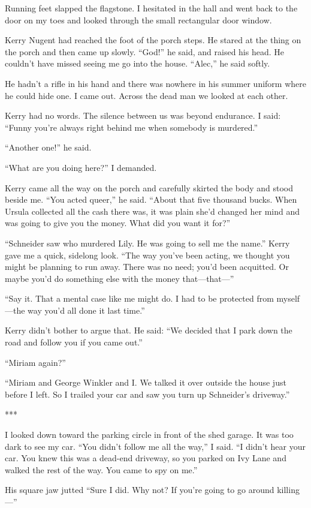 \documentclass{novel}
\begin{document}
Running feet slapped the flagstone. I hesitated in the hall and went back to the door on my toes and looked through the small rectangular door window.

Kerry Nugent had reached the foot of the porch steps. He stared at the thing on the porch and then came up slowly. “God!” he said, and raised his head. He couldn’t have missed seeing me go into the house. “Alec,” he said softly.

He hadn’t a rifle in his hand and there was nowhere in his summer uniform where he could hide one. I came out. Across the dead man we looked at each other.

Kerry had no words. The silence between us was beyond endurance. I said: “Funny you’re always right behind me when somebody is murdered.”

“Another one!” he said.

“What are you doing here?” I demanded.

Kerry came all the way on the porch and carefully skirted the body and stood beside me. “You acted queer,” he said. “About that five thousand bucks. When Ursula collected all the cash there was, it was plain she’d changed her mind and was going to give you the money. What did you want it for?”

“Schneider saw who murdered Lily. He was going to sell me the name.” Kerry gave me a quick, sidelong look. “The way you’ve been acting, we thought you might be planning to run away. There was no need; you’d been acquitted. Or maybe you’d do something else with the money that—that—”

“Say it. That a mental case like me might do. I had to be protected from myself—the way you’d all done it last time.”

Kerry didn’t bother to argue that. He said: “We decided that I park down the road and follow you if you came out.”

“Miriam again?”

“Miriam and George Winkler and I. We talked it over outside the house just before I left. So I trailed your car and saw you turn up Schneider’s driveway.”

***

I looked down toward the parking circle in front of the shed garage. It was too dark to see my car. “You didn’t follow me all the way,” I said. “I didn’t hear your car. You knew this was a dead-end driveway, so you parked on Ivy Lane and walked the rest of the way. You came to spy on me.”

His square jaw jutted “Sure I did. Why not? If you’re going to go around killing—”
\end{document}
